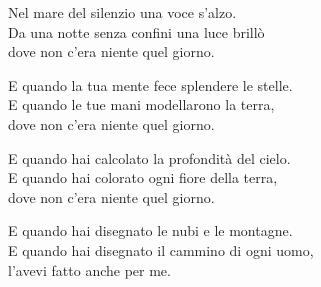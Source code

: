 
\strofa Nel mare del silenzio una voce s'alzo.\\
Da una notte senza confini una luce brillò\\
dove non c'era niente quel giorno.

\spazio


\spazio

\strofa E quando la tua mente fece splendere le stelle.\\
E quando le tue mani modellarono la terra,\\
dove non c'era niente quel giorno.

\spazio


\spazio

\strofa E quando hai calcolato la profondità del cielo.\\
E quando hai colorato ogni fiore della terra,\\
dove non c'era niente quel giorno.

\spazio


\spazio

\strofa E quando hai disegnato le nubi e le montagne.\\
E quando hai disegnato il cammino di ogni uomo,\\
l'avevi fatto anche per me.

\spazio

